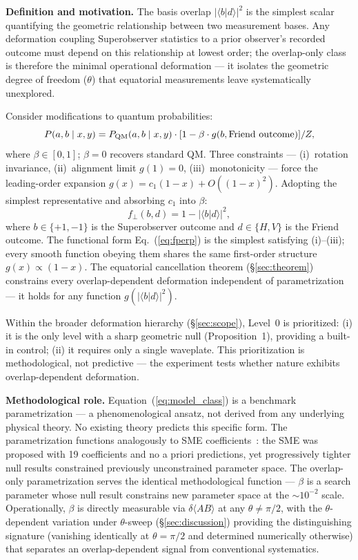 \documentclass[twocolumn,aps,pra,superscriptaddress,floatfix,10pt]{revtex4-2}
\begin{document}
\textbf{Definition and motivation.} The basis overlap $|\langle b|d\rangle|^2$ is the simplest
scalar quantifying the geometric relationship between two measurement bases.
Any deformation coupling Superobserver statistics to a prior observer's recorded
outcome must depend on this relationship at lowest order; the overlap-only
class is therefore the minimal operational deformation --- it isolates the
geometric degree of freedom ($\theta$) that equatorial measurements leave
systematically unexplored.

Consider modifications to quantum probabilities:
\begin{equation}
P(a,b \mid x,y) = P_{\rm QM}(a,b \mid x,y) \cdot [1 - \beta \cdot g(b, \text{Friend outcome})] / Z,
\label{eq:model_class}
\end{equation}
where $\beta \in [0,1]$; $\beta = 0$ recovers standard QM. Three constraints --- (i)~rotation
invariance, (ii)~alignment limit $g(1)=0$, (iii)~monotonicity --- force the
leading-order expansion $g(x) = c_1(1-x) + O((1-x)^2)$. Adopting the simplest
representative and absorbing $c_1$ into $\beta$:
\begin{equation}
f_\perp(b, d) = 1 - |\langle b|d\rangle|^2,
\label{eq:fperp}
\end{equation}
where $b \in \{+1,-1\}$ is the Superobserver outcome and $d \in \{H,V\}$ is the Friend
outcome. The functional form Eq.~(\ref{eq:fperp}) is the simplest satisfying (i)--(iii);
every smooth function obeying them shares the same first-order structure
$g(x) \propto (1-x)$. The equatorial cancellation theorem (\S\ref{sec:theorem}) constrains every
overlap-dependent deformation independent of parametrization --- it holds for
any function $g(|\langle b|d\rangle|^2)$.

Within the broader deformation hierarchy (\S\ref{sec:scope}), Level~0 is prioritized:
(i) it is the only level with a sharp geometric null (Proposition~1),
providing a built-in control; (ii) it requires only a single waveplate.
This prioritization is methodological, not predictive --- the experiment
tests whether nature exhibits overlap-dependent deformation.

\textbf{Methodological role.} Equation~(\ref{eq:model_class}) is a benchmark parametrization --- a
phenomenological ansatz, not derived from any underlying physical theory.
No existing theory predicts this specific form. The parametrization functions
analogously to SME coefficients~\cite{Colladay1997}: the SME was proposed with 19
coefficients and no a priori predictions, yet progressively tighter null
results constrained previously unconstrained parameter space. The
overlap-only parametrization serves the identical methodological function
--- $\beta$ is a search parameter whose null result constrains new parameter space
at the $\sim\!10^{-2}$ scale. Operationally, $\beta$ is directly measurable via $\delta\langle AB\rangle$ at
any $\theta \neq \pi/2$, with the $\theta$-dependent variation under $\theta$-sweep (\S\ref{sec:discussion}) providing the
distinguishing signature (vanishing identically at $\theta = \pi/2$ and determined
numerically otherwise) that separates an overlap-dependent signal from
conventional systematics.
\end{document}
